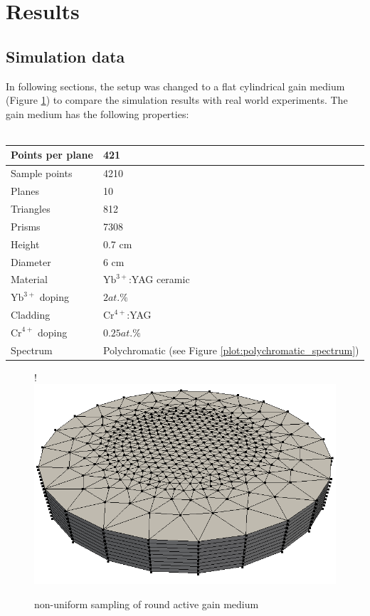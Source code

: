\section{Results}

\subsection{Simulation data}
In following sections, the setup was changed to a flat cylindrical gain medium 
(Figure \ref{graphic:samples_round}) to compare the simulation
results with real world experiments. The gain medium has the following
properties:
\\
\\ 
\begin{tabular}{| l | l |}
\hline
Points per plane        & 421\\
\hline
Sample points           & 4210\\
\hline
Planes                  & 10\\
\hline
Triangles               & 812\\
\hline
Prisms                  & 7308\\
\hline
Height                  & 0.7 cm\\
\hline
Diameter                & 6 cm\\
\hline
Material                & $\text{Yb}^{3+}$:YAG ceramic\\
\hline
$\text{Yb}^{3+}$ doping & $2at.\%$\\
\hline
Cladding                & $\text{Cr}^{4+}$:YAG\\
\hline
$\text{Cr}^{4+}$ doping & $0.25at.\%$\\
\hline
Spectrum                & Polychromatic (see Figure \ref{plot:polychromatic_spectrum})\\
\hline
\end{tabular}

\begin{figure}[H]
  \centerline{
     {!} {\includegraphics{graphics/samples_round.png}}
  }
  \caption{non-uniform sampling of round active gain medium}
  \label{graphic:samples_round}
\end{figure}

